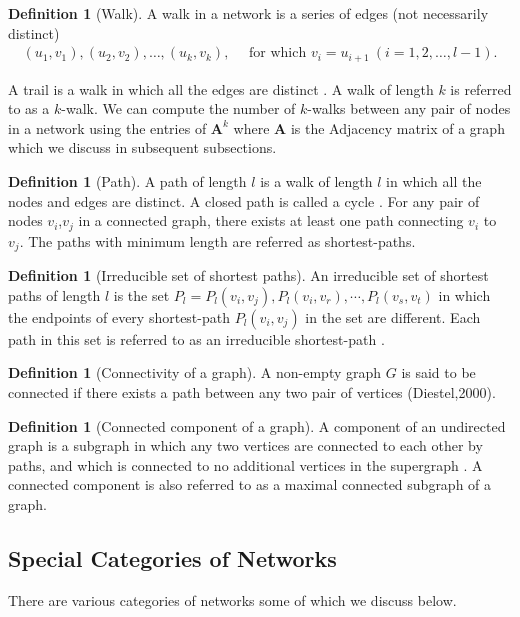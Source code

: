 \documentclass[10pt,a4paper]{article}
\theoremstyle{plain}
\theoremstyle{definition}
\newtheorem{defn}[subsection]{Definition}
\begin{document}
\begin{defn}[Walk]
	A walk in a network is a series of edges (not necessarily distinct)
	\begin{eqnarray*}
		(u_1,v_1),(u_2,v_2),\ldots,(u_k,v_k),\quad \text{ for which }  v_i=u_{i+1} ~(i=1,2,\ldots,l-1).
	\end{eqnarray*}

 A trail is a walk in which all the edges are distinct \citep{estrada2015first}. A walk of length $k$ is referred to as a $k$-walk. We can compute the number of $k$-walks between any pair of nodes in a network using the entries of $\mathbf{A}^k$ where $\mathbf{A}$ is the Adjacency matrix of a graph which we discuss in subsequent subsections.
\end{defn}

\begin{defn}[Path]
	A path of length $l$ is a walk of length $l$ in which all the nodes and edges are distinct. A closed path is called a cycle \citep{estrada2011structure}. For any pair of nodes $v_i$,$v_j$ in a connected graph, there exists at least one path connecting $v_i$ to $v_j$. The paths with minimum length are referred as shortest-paths.
\end{defn}

\begin{defn}[Irreducible set of shortest paths]
	
	An irreducible set of shortest paths of length $l$ is the set $P_l ={P_l(v_i,v_j),P_l(v_i,v_r),\cdots, P_l(v_s,v_t)}$ in which the endpoints of every shortest-path $P_l(v_i,v_j)$ in the set are different.
	Each path in this set is referred to as an irreducible shortest-path \citep{estrada2012path}.\end{defn}


\begin{defn}[Connectivity of a graph]
	A non-empty graph $G$ is said to be connected if there exists a path between any two pair of vertices (Diestel,2000). 
\end{defn}

\begin{defn}[Connected component of a graph]
	A component of an undirected graph is a subgraph in which any two vertices are connected to each other by paths, and which is connected to no additional vertices in the supergraph \citep{newman2010networks}. 
	A connected component is also referred to as a maximal connected subgraph of a graph.
\end{defn}


\subsection{Special Categories of Networks}
There are various categories of networks some of which we discuss below.
\end{document}
